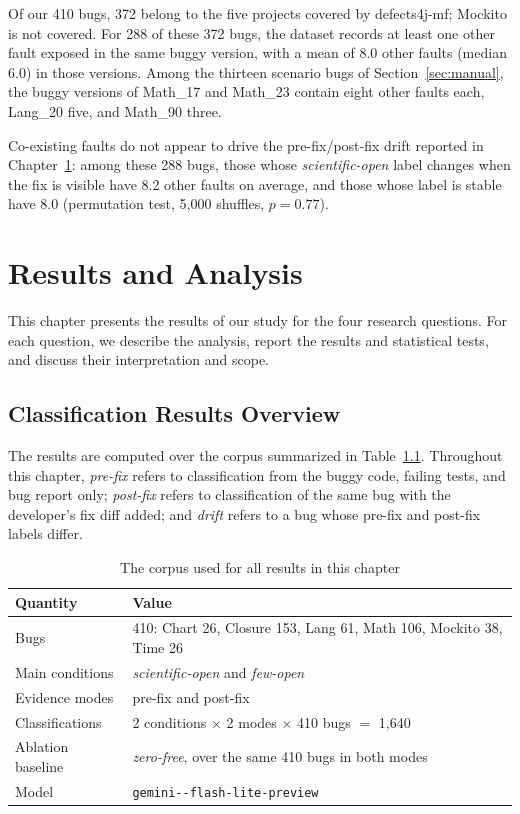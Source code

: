 \documentclass{iutbscthesis}
\newcommand{\modelname}{\texttt{gemini-\allowbreak 3.1-\allowbreak flash-\allowbreak lite-\allowbreak preview}}
\begin{document}
Of our 410 bugs, 372 belong to the five projects covered by defects4j-mf; Mockito is not covered. For 288 of these 372 bugs, the dataset records at least one other fault exposed in the same buggy version, with a mean of 8.0 other faults (median 6.0) in those versions. Among the thirteen scenario bugs of Section~\ref{sec:manual}, the buggy versions of Math\_17 and Math\_23 contain eight other faults each, Lang\_20 five, and Math\_90 three.

Co-existing faults do not appear to drive the pre-fix/post-fix drift reported in Chapter~\ref{chapter:results}: among these 288 bugs, those whose \textit{scientific-open} label changes when the fix is visible have 8.2 other faults on average, and those whose label is stable have 8.0 (permutation test, 5{,}000 shuffles, $p = 0.77$).


\chapter{Results and Analysis} \label{chapter:results}

This chapter presents the results of our study for the four research questions. For each question, we describe the analysis, report the results and statistical tests, and discuss their interpretation and scope.

\section{Classification Results Overview}

The results are computed over the corpus summarized in Table~\ref{tab:corpus_summary}. Throughout this chapter, \emph{pre-fix} refers to classification from the buggy code, failing tests, and bug report only; \emph{post-fix} refers to classification of the same bug with the developer's fix diff added; and \emph{drift} refers to a bug whose pre-fix and post-fix labels differ.

\begin{table}[!htbp]
    \centering
    \begin{tabular}{p{4.6cm} p{8.6cm}}
        \toprule
        \textbf{Quantity} & \textbf{Value} \\
        \midrule
        Bugs & 410: Chart 26, Closure 153, Lang 61, Math 106, Mockito 38, Time 26 \\
        Main conditions & \textit{scientific-open} and \textit{few-open} \\
        Evidence modes & pre-fix and post-fix \\
        Classifications & 2 conditions $\times$ 2 modes $\times$ 410 bugs $=$ 1{,}640 \\
        Ablation baseline & \textit{zero-free}, over the same 410 bugs in both modes \\
        Model & \modelname \\
        \bottomrule
    \end{tabular}
    \caption{The corpus used for all results in this chapter}
    \label{tab:corpus_summary}
\end{table}
\end{document}

